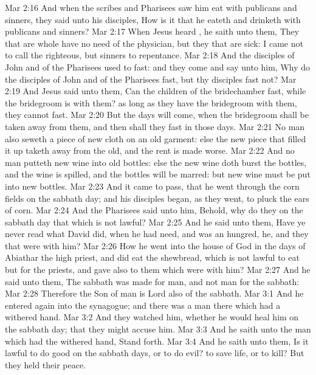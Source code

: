 \vs Mar 2:16 And when the scribes and Pharisees saw him eat with publicans and sinners, they said unto his disciples, How is it that he eateth and drinketh with publicans and sinners?
\vs Mar 2:17 When Jesus heard , he saith unto them, They that are whole have no need of the physician, but they that are sick: I came not to call the righteous, but sinners to repentance.
\vs Mar 2:18 And the disciples of John and of the Pharisees used to fast: and they come and say unto him, Why do the disciples of John and of the Pharisees fast, but thy disciples fast not?
\vs Mar 2:19 And Jesus said unto them, Can the children of the bridechamber fast, while the bridegroom is with them? as long as they have the bridegroom with them, they cannot fast.
\vs Mar 2:20 But the days will come, when the bridegroom shall be taken away from them, and then shall they fast in those days.
\vs Mar 2:21 No man also seweth a piece of new cloth on an old garment: else the new piece that filled it up taketh away from the old, and the rent is made worse.
\vs Mar 2:22 And no man putteth new wine into old bottles: else the new wine doth burst the bottles, and the wine is spilled, and the bottles will be marred: but new wine must be put into new bottles.
\vs Mar 2:23 And it came to pass, that he went through the corn fields on the sabbath day; and his disciples began, as they went, to pluck the ears of corn.
\vs Mar 2:24 And the Pharisees said unto him, Behold, why do they on the sabbath day that which is not lawful?
\vs Mar 2:25 And he said unto them, Have ye never read what David did, when he had need, and was an hungred, he, and they that were with him?
\vs Mar 2:26 How he went into the house of God in the days of Abiathar the high priest, and did eat the shewbread, which is not lawful to eat but for the priests, and gave also to them which were with him?
\vs Mar 2:27 And he said unto them, The sabbath was made for man, and not man for the sabbath:
\vs Mar 2:28 Therefore the Son of man is Lord also of the sabbath.
\vs Mar 3:1 And he entered again into the synagogue; and there was a man there which had a withered hand.
\vs Mar 3:2 And they watched him, whether he would heal him on the sabbath day; that they might accuse him.
\vs Mar 3:3 And he saith unto the man which had the withered hand, Stand forth.
\vs Mar 3:4 And he saith unto them, Is it lawful to do good on the sabbath days, or to do evil? to save life, or to kill? But they held their peace.
